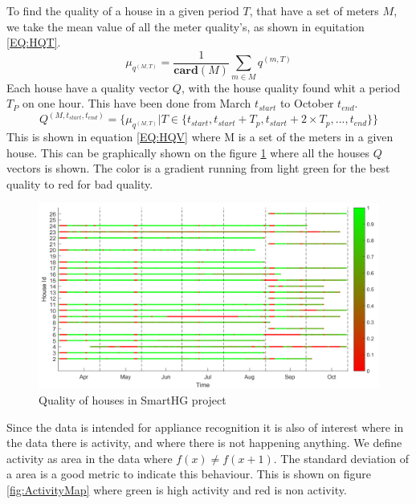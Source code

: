 To find the quality of a house in a given period $T$, that have a set of meters $M$, we take the mean value of all the meter quality's, as shown in equitation \ref{EQ:HQT}.  
\begin{equation}
	\mu_{q^{(M,T)}} = \frac{1}{\mathbf{card}(M)} \sum_{m \in M} q^{(m,T)}
	\label{EQ:HQT}
\end{equation}
Each house have a quality vector $Q$, with the house quality found whit a period $T_P$ on one hour. This have been done from March $t_{start}$ to October $t_{end}$. 
\begin{equation}
	Q^{(M,t_{start},t_{end} )} = \{ \mu_{q^{(M,T)}} | T \in \{t_{start}, t_{start}+T_p,t_{start}+2 \times T_p, ... , t_{end}  \} \}
	\label{EQ:HQV}
\end{equation}
This is shown in equation \ref{EQ:HQV} where M is a set of the meters in a given house. This can be graphically shown on the figure \ref{fig:SmartHGQuality} where all the houses $Q$ vectors is shown. The color is a gradient running from light green for the best quality to red for bad quality.
\begin{figure}[H]
\centering
\includegraphics[width=1\textwidth]{billeder/QualityBig.png}
\caption{Quality of houses in SmartHG project}
\label{fig:SmartHGQuality}
\end{figure} 
Since the data is intended for appliance recognition it is also of interest where in the data there is activity, and where there is not happening anything. We define activity as area in the data where $f(x) \neq f(x+1) $. The standard deviation of a area is a good metric to indicate this behaviour. This is shown on figure \ref{fig:ActivityMap} where green is high activity and red is non activity. 
